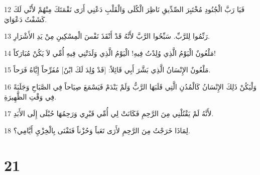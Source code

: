 \par 12 فَيَا رَبَّ الْجُنُودِ مُخْتَبِرَ الصِّدِّيقِ نَاظِرَ الْكُلَى وَالْقَلْبِ دَعْنِي أَرَى نَقْمَتَكَ مِنْهُمْ لأَنِّي لَكَ كَشَفْتُ دَعْوَايَ.
\par 13 رَنِّمُوا لِلرَّبِّ. سَبِّحُوا الرَّبَّ لأَنَّهُ قَدْ أَنْقَذَ نَفْسَ الْمِسْكِينِ مِنْ يَدِ الأَشْرَارِ.
\par 14 مَلْعُونٌ الْيَوْمُ الَّذِي وُلِدْتُ فِيهِ! الْيَوْمُ الَّذِي وَلَدَتْنِي فِيهِ أُمِّي لاَ يَكُنْ مُبَارَكاً!
\par 15 مَلْعُونٌ الإِنْسَانُ الَّذِي بَشَّرَ أَبِي قَائِلاً: [قَدْ وُلِدَ لَكَ ابْنٌ] مُفَرِّحاً إِيَّاهُ فَرَحاً.
\par 16 وَلْيَكُنْ ذَلِكَ الإِنْسَانُ كَالْمُدُنِ الَّتِي قَلَبَهَا الرَّبُّ وَلَمْ يَنْدَمْ فَيَسْمَعَ صِيَاحاً فِي الصَّبَاحِ وَجَلَبَةً فِي وَقْتِ الظَّهِيرَةِ.
\par 17 لأَنَّهُ لَمْ يَقْتُلْنِي مِنَ الرَّحِمِ فَكَانَتْ لِي أُمِّي قَبْرِي وَرَحِمُهَا حُبْلَى إِلَى الأَبَدِ.
\par 18 لِمَاذَا خَرَجْتُ مِنَ الرَّحِمِ لأَرَى تَعَباً وَحُزْناً فَتَفْنَى بِالْخِزْيِ أَيَّامِي؟.

\chapter{21}

